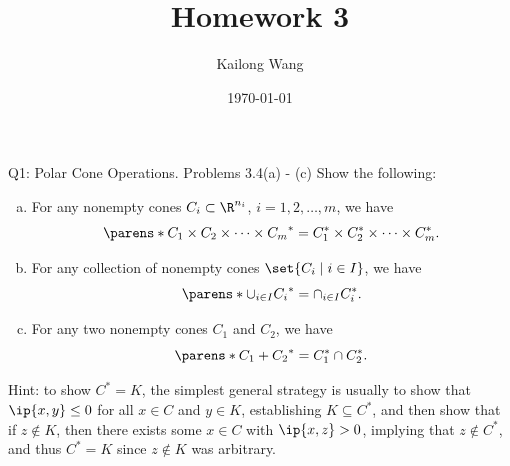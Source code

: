 \documentclass{article}
\title{Homework 3}
\author{Kailong Wang}
\date{\today}
\theoremstyle{plain}
\theoremstyle{definition}
\theoremstyle{remark}
\begin{document}
\maketitle

\begin{problem}
    {Q1: Polar Cone Operations. Problems 3.4(a) - (c)}
    Show the following:
    \begin{enumerate}[(a)]
        \item For any nonempty cones $C_i\subset \R^{n_i}$, $i=1,2,\ldots,m$, we have \[\parens*{C_1 \times C_2 \times \cdots \times C_m}^*=C_1^*\times C_2^* \times \cdots \times C_m^*.\]
        \item For any collection of nonempty cones $\set{C_i\mid i\in I}$, we have \[\parens*{\cup_{i\in I}C_i}^*=\cap_{i\in I}C_i^*.\]
        \item For any two nonempty cones $C_1$ and $C_2$, we have \[\parens*{C_1+C_2}^*=C_1^*\cap C_2^*.\]
    \end{enumerate}
    Hint: to show $C^*=K$, the simplest general strategy is usually to show that $\ip{x,y}\leq 0$ for all $x\in C$ and $y\in K$, establishing $K\subseteq C^*$, and then show that if $z\notin K$, then there exists some $x\in C$ with $\ip{x,z}>0$, implying that $z\notin C^*$, and thus $C^*=K$ since $z\notin K$ was arbitrary.
\end{problem}
\end{document}
